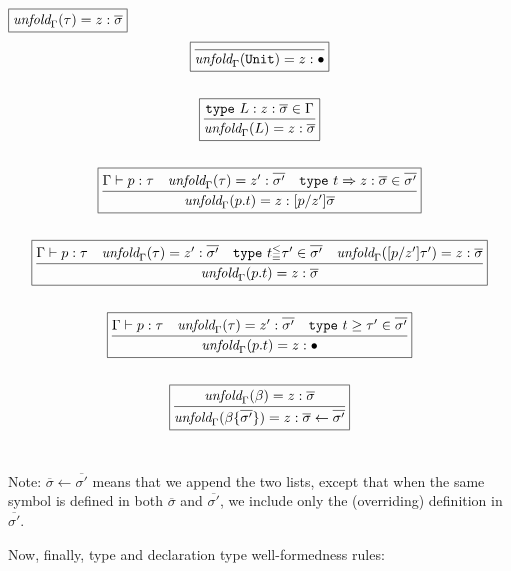 \documentclass{article}
\newcommand{\keywadj}[1]{\mathtt{#1}}
\newcommand{\keyw}[1]{\keywadj{#1}~}
\begin{document}
$\fbox{$\textit{unfold}_\Gamma(\tau) = z:\overline{\sigma}$}$
\[
\begin{array}{c}

\boxed{\infer
  {\textit{unfold}_\Gamma(\keywadj{Unit}) = z:\bullet}
  {}
}\\[5ex]
  
\boxed{\infer
  {\textit{unfold}_\Gamma(L) = z:\overline{\sigma}}
  {\keyw{type} L : z: \overline{\sigma} \in \Gamma}
}\\[5ex]

\boxed{\infer
  {\textit{unfold}_\Gamma(p.t) = z:[p/z']\overline{\sigma}}
  {\Gamma \vdash p : \tau & \textit{unfold}_\Gamma(\tau) = z': \overline{\sigma'} &\keyw{type} t \Rightarrow z : \overline{\sigma} \in \overline{\sigma'}}
}\\[5ex]

\boxed{\infer
  {\textit{unfold}_\Gamma(p.t) = z:\overline{\sigma}}
  {\Gamma \vdash p: \tau & \textit{unfold}_\Gamma(\tau) = z': \overline{\sigma'} & \keyw{type} t^{\leq}_{=} \tau' \in \overline{\sigma'}& \textit{unfold}_\Gamma([p/z']\tau') = z: \overline\sigma}
}\\[5ex]

\boxed{\infer
  {\textit{unfold}_\Gamma(p.t) = z:\bullet}
  {\Gamma \vdash p: \tau & \textit{unfold}_\Gamma(\tau) = z': \overline{\sigma'} & \keyw{type} t \geq \tau' \in \overline{\sigma'}}
}\\[5ex]
  
\boxed{\infer
  {\textit{unfold}_\Gamma(\beta \{\overline{\sigma'}\}) = z:\overline{\sigma} \leftarrow \overline{\sigma'}}
  {\textit{unfold}_\Gamma(\beta) = z:\overline{\sigma}}
}\\[5ex]
  
\end{array}
\]

Note: $\overline{\sigma} \leftarrow \overline{\sigma'}$ means that we append the two lists, except that when the same symbol is defined in both $\overline{\sigma}$ and $\overline{\sigma'}$, we include only the (overriding) definition in $\overline{\sigma'}$.

Now, finally, type and declaration type well-formedness rules:
\end{document}
